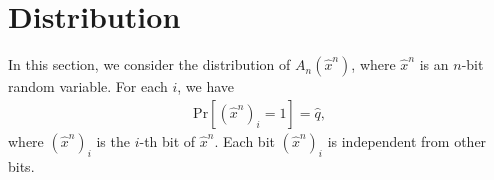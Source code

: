 \documentclass[dvipdfmx,english]{ampmt} %
\begin{document}
\section{Distribution}\label{sec:distribution}
%
In this section, we consider the distribution of $A_n(\hat{x}^n)$, where $\hat{x}^n$ is an $n$-bit random variable. For each $i$, we have
\begin{align}
  \mathrm{Pr}[(\hat{x}^n)_i = 1] = \hat{q},
\end{align}
where $(\hat{x}^n)_i$ is the $i$-th bit of $\hat{x}^n$. Each bit $(\hat{x}^n)_i$ is independent from other bits.
%
\end{document}
